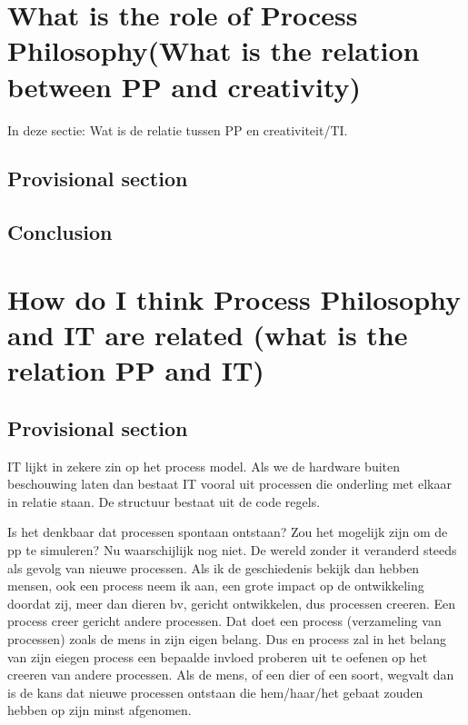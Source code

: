 \documentclass[a4paper]{Thesis}
\begin{document}
\chapter{What is the role of Process Philosophy(What is the relation between PP and creativity)}

In deze sectie: Wat is de relatie tussen PP en creativiteit/TI.

\section{Provisional section}
\section{Conclusion}

\chapter{How do I think Process Philosophy and IT are related (what is the relation PP and IT)}
\section{Provisional section}



IT lijkt in zekere zin op het process model. Als we de hardware buiten beschouwing laten dan bestaat IT vooral uit processen die onderling met elkaar in relatie staan. De structuur bestaat uit de code regels.

Is het denkbaar dat processen spontaan ontstaan? Zou het mogelijk zijn om de pp te simuleren?
Nu waarschijlijk nog niet.
De wereld zonder it veranderd steeds als gevolg van nieuwe processen.
 Als ik de geschiedenis bekijk dan hebben mensen, ook een process neem ik aan, een grote impact op de ontwikkeling doordat zij, meer dan dieren bv, gericht ontwikkelen, dus processen creeren. Een process creer gericht andere processen.
Dat doet een process (verzameling van processen) zoals de mens in zijn eigen belang. Dus en process zal in het belang van zijn eiegen process een bepaalde invloed proberen uit te oefenen op het creeren van andere processen. Als de mens, of een dier of een soort, wegvalt dan is de kans dat nieuwe processen ontstaan die hem/haar/het gebaat zouden hebben op zijn minst afgenomen.
\end{document}
